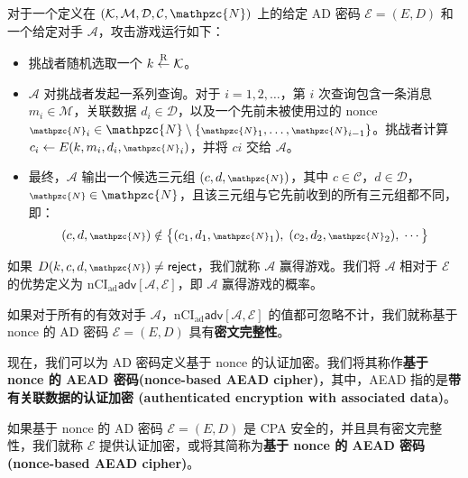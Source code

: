 \begin{game}[密文完整性]\label{game:9-3}
对于一个定义在 $(\mathcal{K},\mathcal{M},\mathcal{D},\mathcal{C},\mathpzc{N})$ 上的给定 AD 密码 $\mathcal{E}=(E,D)$ 和一个给定对手 $\mathcal{A}$，攻击游戏运行如下：
\begin{itemize}
	\item 挑战者随机选取一个 $k\overset{\rm R}\leftarrow\mathcal{K}$。
	\item $\mathcal{A}$ 对挑战者发起一系列查询。对于 $i=1,2,\dots$，第 $i$ 次查询包含一条消息 $m_i\in\mathcal{M}$，关联数据 $d_i\in\mathcal{D}$，以及一个先前未被使用过的 nonce ${\scriptstyle\mathpzc{N}}_i\in\mathpzc{N}\setminus\{{\scriptstyle\mathpzc{N}}_1,\dots,{\scriptstyle\mathpzc{N}}_{i-1}\}$。挑战者计算 $c_i\leftarrow E(k,m_i,d_i,{\scriptstyle\mathpzc{N}}_i)$，并将 $ci$ 交给 $\mathcal{A}$。
	\item 最终，$\mathcal{A}$ 输出一个候选三元组 $(c,d,{\scriptstyle\mathpzc{N}})$，其中 $c\in\mathcal{C}$，$d\in\mathcal{D}$，${\scriptstyle\mathpzc{N}}\in\mathpzc{N}$，且该三元组与它先前收到的所有三元组都不同，即：
		\[
		(c,d,{\scriptstyle\mathpzc{N}})\notin
		\big\{
			(c_1,d_1,{\scriptstyle\mathpzc{N}}_1),\;
			(c_2,d_2,{\scriptstyle\mathpzc{N}}_2),\;
			\cdots
		\big\}
		\]
\end{itemize}
如果 $D(k,c,d,{\scriptstyle\mathpzc{N}})\neq\mathsf{reject}$，我们就称 $\mathcal{A}$ 赢得游戏。我们将 $\mathcal{A}$ 相对于 $\mathcal{E}$ 的优势定义为 $\mathrm{nCI}_\mathrm{ad}\mathsf{adv}[\mathcal{A},\mathcal{E}]$，即 $\mathcal{A}$ 赢得游戏的概率。
\end{game}

\begin{definition}\label{def:9-8}
如果对于所有的有效对手 $\mathcal{A}$，$\mathrm{nCI}_\mathrm{ad}\mathsf{adv}[\mathcal{A},\mathcal{E}]$ 的值都可忽略不计，我们就称基于 nonce 的 AD 密码 $\mathcal{E}=(E,D)$ 具有\textbf{密文完整性}。
\end{definition}

\begin{snote}[认证加密。]
现在，我们可以为 AD 密码定义基于 nonce 的认证加密。我们将其称作\textbf{基于 nonce 的 AEAD 密码(nonce-based AEAD cipher)}，其中，AEAD 指的是\textbf{带有关联数据的认证加密 (authenticated encryption with associated data)}。
\end{snote}

\begin{definition}\label{def:9-9}
如果基于 nonce 的 AD 密码 $\mathcal{E}=(E,D)$ 是 CPA 安全的，并且具有密文完整性，我们就称 $\mathcal{E}$ 提供认证加密，或将其简称为\textbf{基于 nonce 的 AEAD 密码(nonce-based AEAD cipher)}。
\end{definition}

